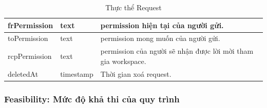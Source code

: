 \begin{center}
\begin{table}[H]
{\begin{tabular}{ |p{3cm} |p{3cm} |p{9cm}|}
                                frPermission & text & permission hiện tại của người gửi. \\
                                \hline
                                toPermission & text & permission mong muốn của người gửi. \\
                                \hline
                                rcpPermission & text & permission của người sẽ nhận được lời mời tham gia workspace. \\
                                \hline
                                deletedAt & timestamp & Thời gian xoá request. \\
                                \hline
                        \end{tabular}
                }
                \caption{Thực thể Request}
        \end{table}
\end{center}

\subsubsection{Feasibility: Mức độ khả thi của quy trình}
\begin{center}
        \begin{table}[H]
                \def\arraystretch{1.5}%
                \caption{Thực thể Feasibility}
        \end{table}
\end{center}

